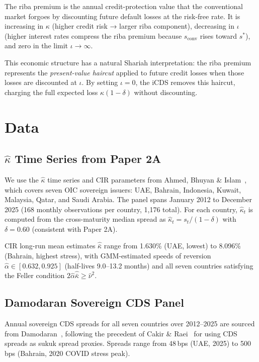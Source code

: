 \documentclass[12pt]{article}
\theoremstyle{plain}
\theoremstyle{definition}
\theoremstyle{remark}
\begin{document}
The riba premium is the annual credit-protection value that the conventional
market forgoes by discounting future default losses at the risk-free rate.
It is increasing in $\kappa$ (higher credit risk → larger riba component),
decreasing in $\iota$ (higher interest rates compress the riba premium because
$s_{\text{conv}}$ rises toward $s^*$), and zero in the limit $\iota \to \infty$.

This economic structure has a natural Shariah interpretation: the riba premium
represents the \emph{present-value haircut} applied to future credit losses
when those losses are discounted at $\iota$.
By setting $\iota = 0$, the iCDS removes this haircut, charging the full
expected loss $\kappa(1-\delta)$ without discounting.

\section{Data}
\label{sec:data}

\subsection{$\hat{\kappa}$ Time Series from Paper 2A}

We use the $\hat{\kappa}$ time series and CIR parameters from
Ahmed, Bhuyan \& Islam~\cite{ABIa2026}, which covers seven OIC sovereign
issuers: UAE, Bahrain, Indonesia, Kuwait, Malaysia, Qatar, and Saudi Arabia.
The panel spans January 2012 to December 2025 (168 monthly observations
per country, 1,176 total).
For each country, $\hat{\kappa}_t$ is computed from the cross-maturity
median spread as $\hat{\kappa}_t = s_t / (1-\delta)$ with $\delta = 0.60$
(consistent with Paper 2A).

CIR long-run mean estimates $\hat{\bar{\kappa}}$ range from 1.630\% (UAE,
lowest) to 8.096\% (Bahrain, highest stress), with GMM-estimated
speeds of reversion $\hat{\alpha} \in [0.632, 0.925]$ (half-lives 9.0--13.2
months) and all seven countries satisfying the Feller condition
$2\hat{\alpha}\hat{\bar{\kappa}} \geq \hat{\nu}^2$.

\subsection{Damodaran Sovereign CDS Panel}

Annual sovereign CDS spreads for all seven countries over 2012--2025 are
sourced from Damodaran~\cite{Damodaran2026}, following the precedent of
Cakir \& Raei~\cite{CakirRaei2007} for using CDS spreads as sukuk spread
proxies.
Spreads range from 48\,bps (UAE, 2025) to 500\,bps (Bahrain, 2020 COVID
stress peak).
\end{document}

